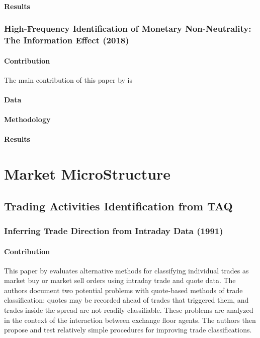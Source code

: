 \documentclass[10pt]{report}
\begin{document}
\subsubsection{Results}







\subsection{High-Frequency Identification of Monetary Non-Neutrality: The Information Effect (2018)}

\subsubsection{Contribution}
The main contribution of this paper by \citet{Nakamura2018HighFrequencyIO} is

\subsubsection{Data}




\subsubsection{Methodology}



\subsubsection{Results}






\chapter{Market MicroStructure}
\section{Trading Activities Identification from TAQ}
\subsection{Inferring Trade Direction from Intraday Data (1991)}
\subsubsection{Contribution}
This paper by \citet{LEE1991InferringTD} evaluates alternative methods for classifying individual trades as market buy or market sell orders using intraday trade and quote data. The authors document
two potential problems with quote-based methods of trade classification: quotes may be recorded ahead of trades that triggered them, and trades inside the spread are not readily classifiable. These problems are analyzed in the context of the interaction between exchange floor agents. The authors then propose and test relatively simple procedures for improving trade classifications.
\end{document}
